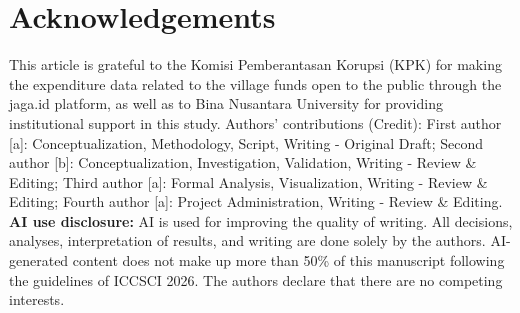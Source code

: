 \documentclass[3p,times,procedia]{elsarticle}
\begin{document}
\section*{Acknowledgements}

This article is grateful to the Komisi Pemberantasan Korupsi (KPK) for making the expenditure data related to the village funds open to the public through the jaga.id platform, as well as to Bina Nusantara University for providing institutional support in this study. Authors' contributions (Credit): First author [a]: Conceptualization, Methodology, Script, Writing - Original Draft; Second author [b]: Conceptualization, Investigation, Validation, Writing - Review \& Editing; Third author [a]: Formal Analysis, Visualization, Writing - Review \& Editing; Fourth author [a]: Project Administration, Writing - Review \& Editing. \textbf{AI use disclosure:} AI is used for improving the quality of writing. All decisions, analyses, interpretation of results, and writing are done solely by the authors. AI-generated content does not make up more than 50\% of this manuscript following the guidelines of ICCSCI 2026. The authors declare that there are no competing interests.
\end{document}
